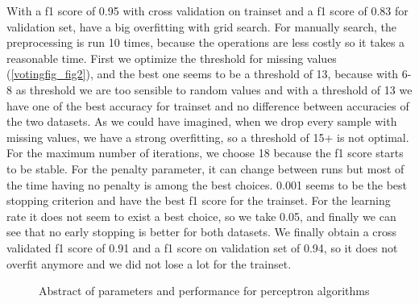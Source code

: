 \documentclass[11pt]{article}
\begin{document}
With a f1 score of 0.95 with cross validation on trainset and a f1 score of 0.83 for validation set, have a big overfitting with grid search. 
For manually search, the preprocessing is run 10 times, because the operations are less costly so it takes a reasonable time. First we optimize the threshold for missing values (\ref{votingfig_fig2}), and the best one seems to be a threshold of 13, because with 6-8 as threshold we are too sensible to random values and with a threshold of 13 we have one of the best accuracy for trainset and no difference between accuracies of the two datasets. As we could have imagined, when we drop every sample with missing values, we have a strong overfitting, so a threshold of 15+ is not optimal. For the maximum number of iterations, we choose 18 because the f1 score starts to be stable. For the penalty parameter, it can change between runs but most of the time having no penalty is among the best choices. 0.001 seems to be the best stopping criterion and have the best f1 score for the trainset. For the learning rate it does not seem to exist a best choice, so we take 0.05, and finally we can see that no early stopping is better for both datasets. 
We finally obtain a cross validated f1 score of 0.91 and a f1 score on validation set of 0.94, so it does not overfit anymore and we did not lose a lot for the trainset.

\begin{figure}[h]
\centering
{}
    \caption{Abstract of parameters and performance for perceptron algorithms}
    \label{tab_voting0}
  \end{figure}
\end{document}
